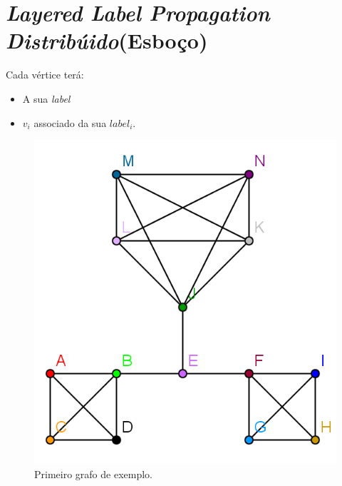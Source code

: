 \documentclass[a4paper,10pt]{report}
\title{}
\author{}
\begin{document}
\section*{\textit{Layered Label Propagation Distribúido}(Esboço)}

Cada vértice terá:
\begin{itemize}
  \item A sua \textit{label}
  \item $v_i$ associado da sua $label_i$.
\end{itemize}

\begin{figure}[h]
\center
\includegraphics{graph_step0}
\caption{Primeiro grafo de exemplo.\label{fig:distributedexample1}}
\end{figure}
\end{document}
